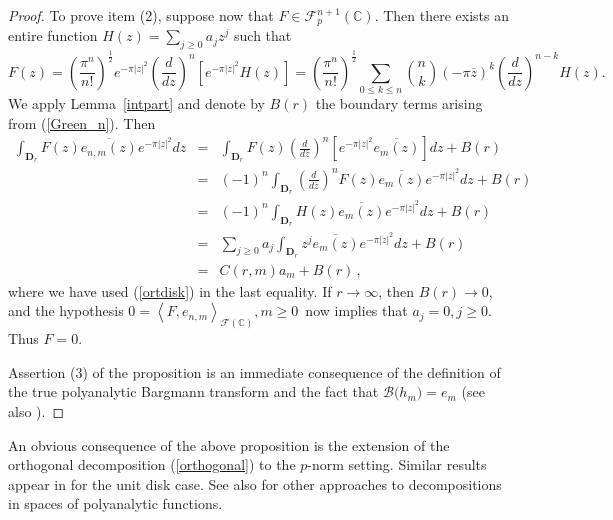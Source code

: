 \documentclass[12pt]{amsart}
\theoremstyle{plain}
\numberwithin{equation}{section}
\begin{document}
\begin{proof}
To prove item (2), suppose now that $F\in \mathcal{F}_{p}^{n+1}(%
\mathbb{C}
)$. Then there exists an entire function $H(z)=\sum_{j\geq 0}a_{j}z^{j}$
such that 
\begin{equation*}
F(z)=\left( \frac{\pi ^{n}}{n!}\right) ^{\frac{1}{2}}e^{-\pi \left\vert
z\right\vert ^{2}}\left( \frac{d}{dz}\right) ^{n}\left[ e^{-\pi \left\vert
z\right\vert ^{2}}H(z)\right] =\left( \frac{\pi ^{n}}{n!}\right) ^{\frac{1}{2%
}}\sum_{0\leq k\leq n}\binom{n}{k}\left( -\pi \overline{z}\right) ^{k}\left( 
\frac{d}{dz}\right) ^{n-k}H(z).
\end{equation*}%
We apply Lemma~\eqref{intpart} and denote by $B(r)$ the boundary terms
arising from (\ref{Green_n}). Then 
\begin{eqnarray*}
\int_{\mathbf{D}_{r}}F(z)\overline{e_{n,m}(z)}e^{-\pi \left\vert
z\right\vert ^{2}}dz &=&\int_{\mathbf{D}_{r}}F(z)\left( \frac{d}{d\overline{z%
}}\right) ^{n}\left[ e^{-\pi \left\vert z\right\vert ^{2}}\overline{e_{m}(z)}%
\right] dz+B(r) \\
&=&(-1)^{n}\int_{\mathbf{D}_{r}}\left( \frac{d}{d\overline{z}}\right)
^{n}F(z)\overline{e_{m}(z)}e^{-\pi \left\vert z\right\vert ^{2}}dz+B(r) \\
&=&(-1)^{n}\int_{\mathbf{D}_{r}}H(z)\overline{e_{m}(z)}e^{-\pi \left\vert
z\right\vert ^{2}}dz+B(r) \\
&=&\sum_{j\geq 0}a_{j}\int_{\mathbf{D}_{r}}z^{j}\overline{e_{m}(z)}e^{-\pi
\left\vert z\right\vert ^{2}}dz+B(r) \\
&=&C(r,m)a_{m}+B(r)\,,
\end{eqnarray*}%
where we have used (\ref{ortdisk}) in the last equality. If $r\rightarrow
\infty $, then $B(r)\rightarrow 0$, and the hypothesis $0=\left\langle
F,e_{n,m}\right\rangle _{\mathcal{F}(%
\mathbb{C}
)},m\geq 0$\ now implies that $a_{j}=0,j\geq 0$. Thus $F=0$.

Assertion (3) of the proposition is an immediate consequence of the
definition of the true polyanalytic Bargmann transform and the fact that $%
\mathcal{B(}h_{m})\mathcal{=}e_{m}$ (see also \cite{Abreusampling}).
\end{proof}

An obvious consequence of the above proposition is the extension of the
orthogonal decomposition (\ref{orthogonal}) to the $p$-norm setting. Similar
results appear in \cite{Ramazanov} for the unit disk case. See also \cite%
{Begehr} for other approaches to decompositions in spaces of polyanalytic
functions.
\end{document}
